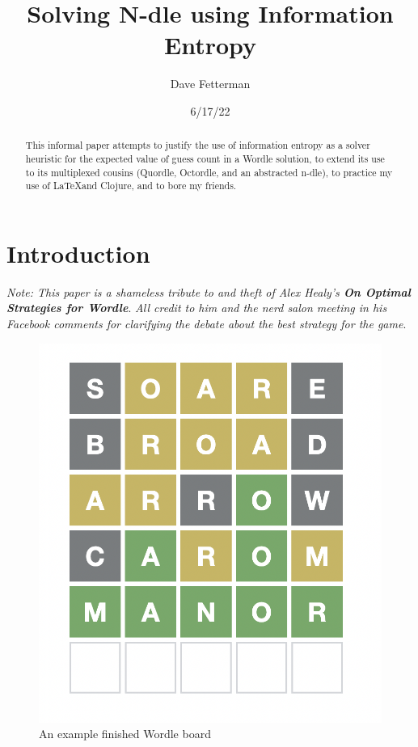 \documentclass[11pt, oneside]{article} 	%
\title{Solving N-dle using Information Entropy}
\author{Dave Fetterman}
\affil{Obviously Unemployed}
\date{6/17/22}
\begin{document}
\maketitle

\begin{abstract}

This informal paper attempts to justify the use of information entropy as a solver heuristic for the expected value of guess count in a Wordle solution, to extend its use to its multiplexed cousins (Quordle, Octordle, and an abstracted n-dle), to practice my use of \LaTeX and Clojure, and to bore my friends.

\end{abstract}

\section{Introduction}

\emph{Note: This paper is a shameless tribute to and theft of Alex Healy's \textbf{On Optimal Strategies for Wordle}}\cite{1}. \emph{All credit to him and the nerd salon meeting in his Facebook comments for clarifying the debate about the best strategy for the game}.
 
\begin{figure}
\centering
\includegraphics[scale=.3]{wordle}
\caption{An example finished Wordle board}
\end{figure}
\end{document}
